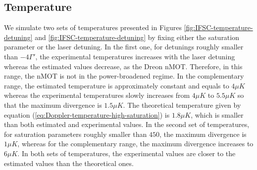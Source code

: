 \subsection{Temperature}
\label{temperature}

We simulate two sets of temperatures presented in Figures \ref{fig:IFSC-temperature-detuning} and \ref{fig:IFSC-temperature-detuning} by fixing either the saturation parameter or the laser detuning. In the first one, for detunings roughly smaller than $ -4 \Gamma' $, the experimental temperatures increases with the laser detuning whereas the estimated values decrease, as the Dreon nMOT. Therefore, in this range, the nMOT is not in the power-broadened regime. In the complementary range, the estimated temperature is approximately constant and equals to $ 4 \mu K $ whereas the experimental temperatures slowly increases from $ 4\mu K $ to $ 5.5\mu K $ so that the maximum divergence is $ 1.5\mu K $. The theoretical temperature given by equation (\ref{eq:Doppler-temperature-high-saturation}) is $ 1.8 \mu K $, which is smaller than both estimated and experimental values. In the second set of temperatures, for saturation parameters roughly smaller than $ 450 $, the maximum divergence is $ 1 \mu K $, whereas for the complementary range, the maximum divergence increases to $ 6\mu K $. In both sets of temperatures, the experimental values are closer to the estimated values than the theoretical ones.

